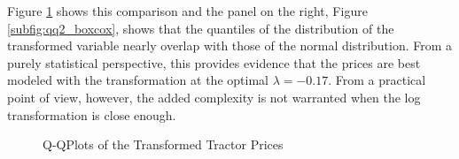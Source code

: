 \documentclass[11pt]{book}
\begin{document}
Figure \ref{fig:qq2_prices} shows this comparison
and the panel on the right, Figure \ref{subfig:qq2_boxcox}, 
shows that the quantiles of the distribution of the transformed variable
nearly overlap with those of the normal distribution.
From a purely statistical perspective, 
this provides evidence that the prices are best modeled with the transformation
at the optimal $\lambda = -0.17$.
From a practical point of view, however, 
the added complexity is not warranted
when the log transformation is close enough.


\begin{figure}[!ht]
\hfill
{}

\caption{Q-QPlots of the Transformed Tractor Prices}
\label{fig:qq2_prices}
\end{figure}








\end{document}
